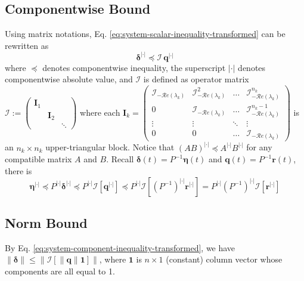 \documentclass[]{uai2023}
\newcommand{\vect}[1]{\mathbf{#1}}
\newcommand{\Err}{\eta}
\newcommand{\I}{\mathcal{I}}
\renewcommand{\Re}[1]{\mathcal{R}e\left(#1\right)}
\newcommand{\abs}{|\cdot|}
\begin{document}
\subsection{Componentwise Bound}
    Using matrix notations, Eq. \ref{eq:system-scalar-inequality-transformed} can be rewritten as
    \begin{equation} \label{eq:system-component-inequality-transformed}
        \pmb{\delta}^{\abs} \preceq \pmb{\I}\,\vect{q}^{\abs}
    \end{equation}
    where $\preceq$ denotes componentwise inequality, the superscript $\abs$ denotes componentwise absolute value, and $\pmb{\I}$ is defined as operator matrix $\pmb{\I} := \begin{pmatrix} \vect{I}_1 \\ & \vect{I}_2 \\ && \ddots \end{pmatrix}$ where each $\vect{I}_k = \begin{pmatrix}
        \I_{-\Re{\lambda_k}} & \I_{-\Re{\lambda_k}}^2 & \dots &\I_{-\Re{\lambda_k}}^{n_k} \\[1ex]
        0 & \I_{-\Re{\lambda_k}} & \dots &\I_{-\Re{\lambda_k}}^{n_k-1} \\
        \vdots & \vdots & \ddots & \vdots \\
        0 & 0 & \dots & \I_{-\Re{\lambda_k}}
    \end{pmatrix}$ is an $n_k \times n_k$ upper-triangular block.
    Notice that $(AB)^{\abs} \preceq A^{\abs} B^{\abs}$ for any compatible matrix $A$ and $B$. Recall $\pmb{\delta}(t) = P^{-1}\pmb{\Err}(t)$ and $\pmb{q}(t) = P^{-1} \vect{r}(t)$, there is
    \begin{equation}
        \pmb{\Err}^{\abs} 
        \preceq P^{\abs}\pmb{\delta}^{\abs} 
        \preceq P^{\abs} \pmb{\I} \left[\vect{q}^{\abs} \right]
        \preceq P^{\abs} \pmb{\I} \left[(P^{-1})^{\abs} \vect{r}^{\abs}\right]
        = P^{\abs} (P^{-1})^{\abs}  \pmb{\I} \left[\vect{r}^{\abs}\right]
    \end{equation}
\subsection{Norm Bound}
    By Eq. \ref{eq:system-component-inequality-transformed}, we have $ \|\pmb{\delta}\| \leq \big\|\pmb{\I} [\|\vect{q}\| \vect{1}]\big\|$, where $\vect{1}$ is $n \times 1$ (constant) column vector whose components are all equal to 1.
\end{document}
